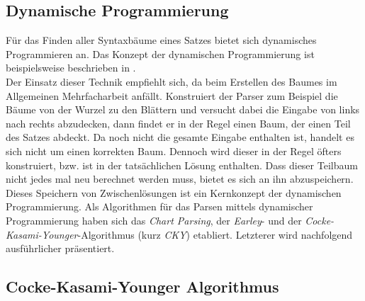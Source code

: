 \subsection{Dynamische Programmierung}
\label{sec:nlp:syn-parsen:dyn-progr}

Für das Finden aller Syntaxbäume eines Satzes bietet sich dynamisches Programmieren an. Das Konzept der dynamischen Programmierung ist beispielsweise beschrieben in \cite{dynamischeprog}. \\
Der Einsatz dieser Technik empfiehlt sich, da beim Erstellen des Baumes im Allgemeinen Mehrfacharbeit anfällt. Konstruiert der Parser zum Beispiel die Bäume von der Wurzel zu den Blättern und versucht dabei die Eingabe von links nach rechts abzudecken, dann findet er in der Regel einen Baum, der einen Teil des Satzes abdeckt. Da noch nicht die gesamte Eingabe enthalten ist, handelt es sich nicht um einen korrekten Baum. Dennoch wird dieser in der Regel öfters konstruiert, bzw. ist in der tatsächlichen Lösung enthalten. Dass dieser Teilbaum nicht jedes mal neu berechnet werden muss, bietet es sich an ihn abzuspeichern. Dieses Speichern von Zwischenlösungen ist ein Kernkonzept der dynamischen Programmierung. Als Algorithmen für das Parsen mittels dynamischer Programmierung haben sich das \textit{Chart Parsing}, der \textit{Earley}- und der \textit{Cocke-Kasami-Younger}-Algorithmus (kurz \textit{CKY}) etabliert. Letzterer wird nachfolgend ausführlicher präsentiert.

\subsection{Cocke-Kasami-Younger Algorithmus}
\label{sec:nlp:syn-parsen:cky}

